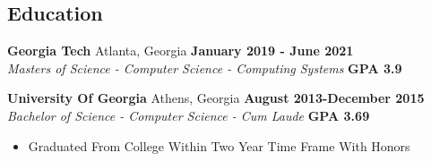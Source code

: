 \documentclass[margin,line]{resume}
\begin{document}
\begin{resume}
	\section{\mysidestyle Education}
	
	\textbf{Georgia Tech} Atlanta, Georgia \hfill \textbf{January 2019 - June 2021}\\
	\textsl{Masters of Science - Computer Science - Computing Systems} \hfill \textbf{GPA 3.9} \vspace{2mm}
	
	\textbf{University Of Georgia} Athens, Georgia \hfill \textbf{August 2013-December 2015} \\
	\textsl{Bachelor of Science - Computer Science - Cum Laude} \hfill \textbf{GPA 3.69}\vspace{2mm}
	\begin{itemize}
		\item Graduated From College Within Two Year Time Frame With Honors
	\end{itemize}
	
\end{resume}
\end{document}
